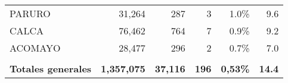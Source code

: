 \begin{tabular}{lrrrrr}
	\cellcolor[HTML]{FFFFC7}PARURO        & 31,264                                                         & 287                                                                             & 3                                                              & 1.0\%                                                                  & 9.6                                                                                                                                \\
	\cellcolor[HTML]{FFFFC7}CALCA         & 76,462                                                         & 764                                                                             & 7                                                              & 0.9\%                                                                  & 9.2                                                                                                                                \\
	\cellcolor[HTML]{FFFFC7}ACOMAYO       & 28,477                                                         & 296                                                                             & 2                                                              & 0.7\%                                                                  & 7.0                                                                                                                                \\
	&                                                                &                                                                                 &                                                                &                                                                        &                                                                                                                                    \\
	\rowcolor[HTML]{ECF4FF} 
	\textbf{Totales generales}            & \textbf{1,357,075}                                             & \textbf{37,116}                                                                 & \textbf{196}                                                   & \textbf{0,53\%}                                                        & \textbf{14.4}                                                                                                                     
\end{tabular}